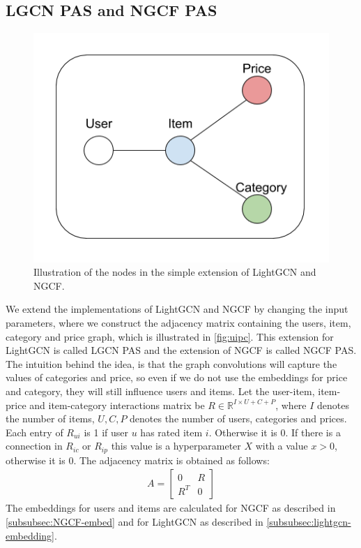 \subsection{LGCN PAS and NGCF PAS}\label{subsec:simple-extension}
\begin{figure}
    \centering
    \includegraphics[scale=0.5]{figures/uipc.png}
    \caption{Illustration of the nodes in the simple extension of LightGCN and NGCF.}
    \label{fig:uipc}
\end{figure}
We extend the implementations of LightGCN and NGCF by changing the input parameters, where we construct the adjacency matrix containing the users, item, category and price graph, which is illustrated in \autoref{fig:uipc}.
This extension for LightGCN is called LGCN PAS and the extension of NGCF is called NGCF PAS.
The intuition behind the idea, is that the graph convolutions will capture the values of categories and price, so even if we do not use the embeddings for price and category, they will still influence users and items.
Let the user-item, item-price and item-category interactions matrix be $R \in \mathbb{R}^{I \times U + C + P}$, where $I$ denotes the number of items, $U, C, P$ denotes the number of users, categories and prices.
Each entry of $R_{ui}$ is 1 if user $u$ has rated item $i$. Otherwise it is 0.
If there is a connection in $R_{ic}$ or $R_{ip}$ this value is a hyperparameter $X$ with a value $x>0$, otherwise it is 0.
The adjacency matrix is obtained as follows:
\begin{gather}
    A =
    \begin{bmatrix}
        0   & R \\
        R^T & 0
    \end{bmatrix}
\end{gather}
The embeddings for users and items are calculated for NGCF as described in \autoref{subsubsec:NGCF-embed} and for LightGCN as described in \autoref{subsubsec:lightgcn-embedding}.
